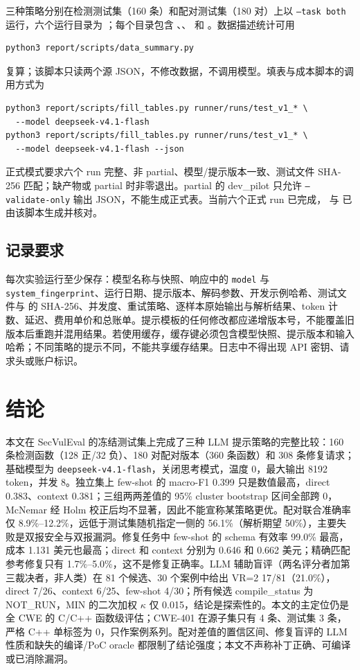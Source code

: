 \documentclass[conference]{IEEEtran}
\begin{document}
三种策略分别在检测测试集（160 条）和配对测试集（180 对）上以 \texttt{--task both} 运行，六个运行目录为 ；每个目录包含 、、 和 。数据描述统计可用
\begin{lstlisting}
python3 report/scripts/data_summary.py
\end{lstlisting}
复算；该脚本只读两个源 JSON，不修改数据，不调用模型。填表与成本脚本的调用方式为
\begin{lstlisting}
python3 report/scripts/fill_tables.py runner/runs/test_v1_* \
  --model deepseek-v4.1-flash
python3 report/scripts/fill_tables.py runner/runs/test_v1_* \
  --model deepseek-v4.1-flash --json
\end{lstlisting}
正式模式要求六个 run 完整、非 partial、模型/提示版本一致、测试文件 SHA-256 匹配；缺产物或 partial 时非零退出。partial 的 dev\_pilot 只允许 \texttt{--validate-only} 输出 JSON，不能生成正式表。当前六个正式 run 已完成， 与  已由该脚本生成并核对。

\subsection{记录要求}
每次实验运行至少保存：模型名称与快照、响应中的 \texttt{model} 与 \texttt{system\_fingerprint}、运行日期、提示版本、解码参数、开发示例哈希、测试文件与  的 SHA-256、并发度、重试策略、逐样本原始输出与解析结果、token 计数、延迟、费用单价和总账单。提示模板的任何修改都应递增版本号，不能覆盖旧版本后重跑并混用结果。若使用缓存，缓存键必须包含模型快照、提示版本和输入哈希；不同策略的提示不同，不能共享缓存结果。日志中不得出现 API 密钥、请求头或账户标识。

\section{结论}
\label{sec:conclusion}
本文在 SecVulEval 的冻结测试集上完成了三种 LLM 提示策略的完整比较：160 条检测函数（128 正/32 负）、180 对配对版本（360 条函数）和 308 条修复请求；基础模型为 \texttt{deepseek-v4.1-flash}，关闭思考模式，温度 0，最大输出 8192 token，并发 8。独立集上 few-shot 的 macro-F1 0.399 只是数值最高，direct 0.383、context 0.381；三组两两差值的 95\% cluster bootstrap 区间全部跨 0，McNemar 经 Holm 校正后均不显著，因此不能宣称某策略更优。配对联合准确率仅 8.9\%--12.2\%，远低于测试集随机指定一侧的 56.1\%（解析期望 50\%），主要失败是双报安全与双报漏洞。修复任务中 few-shot 的 schema 有效率 99.0\% 最高，成本 1.131 美元也最高；direct 和 context 分别为 0.646 和 0.662 美元；精确匹配参考修复只有 1.7\%--5.0\%，这不是修复正确率。LLM 辅助盲评（两名评分者加第三裁决者，非人类）在 81 个候选、30 个案例中给出 VR=2 17/81（21.0\%），direct 7/26、context 6/25、few-shot 4/30；所有候选 compile\_status 为 NOT\_RUN，MIN 的二次加权 $\kappa$ 仅 0.015，结论是探索性的。本文的主定位仍是全 CWE 的 C/C++ 函数级评估；CWE-401 在源子集只有 4 条、测试集 3 条，严格 C++ 单标签为 0，只作案例系列。配对差值的置信区间、修复盲评的 LLM 性质和缺失的编译/PoC oracle 都限制了结论强度；本文不声称补丁正确、可编译或已消除漏洞。
\end{document}
